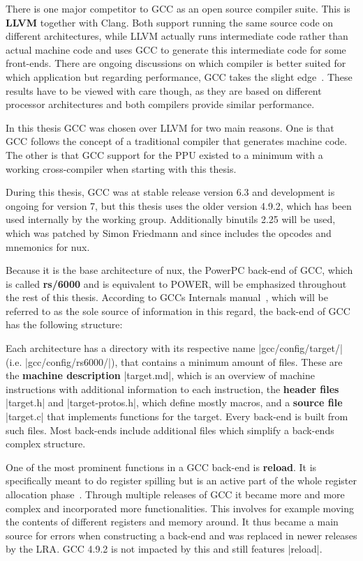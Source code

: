 {There is one major competitor to \ac{GCC} as an open source compiler suite.
This is \textbf{\ac{LLVM}} together with Clang.
Both support running the same source code on different architectures, while \ac{LLVM} actually runs intermediate code rather than actual machine code and uses \ac{GCC} to generate this intermediate code for some front-ends.
There are ongoing discussions on which compiler is better suited for which application but regarding performance, \ac{GCC} takes the slight edge~\citep{llvmgcceisc, llvmgccarm}.
These results have to be viewed with care though, as they are based on different processor architectures and both compilers provide similar performance.

In this thesis \ac{GCC} was chosen over \ac{LLVM} for two main reasons.
One is that \ac{GCC} follows the concept of a traditional compiler that generates machine code.
The other is that \ac{GCC} support for the \ac{PPU} existed to a minimum with a working cross-compiler when starting with this thesis.

During this thesis, \ac{GCC} was at stable release version 6.3 and development is ongoing for version 7, but this thesis uses the older version 4.9.2, which has been used internally by the working group.
Additionally binutils 2.25 will be used, which was patched by Simon Friedmann and since includes the opcodes and mnemonics for nux.

Because it is the base architecture of nux, the PowerPC back-end of \ac{GCC}, which is called \textbf{\ac{rs/6000}} and is equivalent to POWER, will be emphasized throughout the rest of this thesis.
According to \ac{GCC}s Internals manual~\cite{GCCint}, which will be referred to as the sole source of information in this regard, the back-end of \ac{GCC} has the following structure:

Each architecture has a directory with its respective name |gcc/config/target/| (i.e. |gcc/config/rs6000/|), that contains a minimum amount of files.
These are the \textbf{machine description} |target.md|, which is an overview of machine instructions with additional information to each instruction, the \textbf{header files} |target.h| and |target-protos.h|, which define mostly macros, and a \textbf{source file} |target.c| that implements functions for the target.
Every back-end is built from such files.
Most back-ends include additional files which simplify a back-ends complex structure.

One of the most prominent functions in a \ac{GCC} back-end is \textbf{reload}.
It is specifically meant to do register spilling but is an active part of the whole register allocation phase~\cite{GCCwiki:reload}.
Through multiple releases of \ac{GCC} it became more and more complex and incorporated more functionalities.
This involves for example moving the contents of different registers and memory around.
It thus became a main source for errors when constructing a back-end and was replaced in newer releases by the \ac{LRA}.
\ac{GCC} 4.9.2 is not impacted by this and still features |reload|.

}
